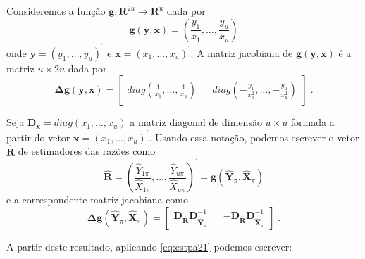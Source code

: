 \documentclass[]{book}
\theoremstyle{definition}
\theoremstyle{definition}
\theoremstyle{definition}
\theoremstyle{remark}
\begin{document}
Consideremos a função
\(\mathbf{g}:\textbf{R}^{2u}\rightarrow \textbf{R}^{u}\) dada por \[
\mathbf{g}\left( \mathbf{y},\mathbf{x}\right) =\left( \frac{y_{1}}{x_{1}},\ldots ,\frac{y_{u}}{x_{u}}\right) 
\] onde \(\mathbf{y=}\left( y_{1},\ldots ,y_{u}\right) ^{^{\prime }}\) e
\(\mathbf{x=}\left( x_{1},\ldots,x_{u}\right) ^{^{\prime }}\). A matriz
jacobiana de \(\mathbf{g}\left( \mathbf{y},\mathbf{x}\right)\) é a
matriz \(u\times 2u\) dada por \[
\mathbf{\Delta g}\left( \mathbf{y},\mathbf{x}\right) =\left[ 
\begin{array}{lll}
diag\left( \frac{1}{x_{1}},\ldots ,\frac{1}{x_{u}}\right) &  & diag\left( -\frac{y_{1}}{x_{1}^{2}},\ldots ,-\frac{y_{u}}{x_{u}^{2}}\right)
\end{array}
\right] \;\mbox{.} 
\]

Seja \(\mathbf{D}_{\mathbf{x}}=diag(x_{1},\ldots ,x_{u})\) a matriz
diagonal de dimensão \(u\times u\) formada a partir do vetor
\(\mathbf{x=}\left( x_{1},\ldots ,x_{u}\right) ^{^{\prime }}\). Usando
essa notação, podemos escrever o vetor \(\widehat{\mathbf{R}}\) de
estimadores das razões como \[
\widehat{\mathbf{R}}\mathbf{=}\left( \frac{\hat{Y}_{1\pi }}{\hat{X}_{1\pi }},\ldots ,\frac{\hat{Y}_{u\pi }}{\hat{X}_{u\pi }}\right) ^{^{\prime }}=\mathbf{g}\left( \mathbf{\hat{Y}}_{\pi },\mathbf{\hat{X}}_{\pi }\right)
\] e a correspondente matriz jacobiana como \[
\mathbf{\Delta g}\left( \mathbf{\hat{Y}}_{\pi },\mathbf{\hat{X}}_{\pi
}\right) =\left[ \begin{array}{lll}
\mathbf{\mathbf{D}_{\widehat{\mathbf{R}}}D}_{\mathbf{\hat{Y}}_{\pi }}^{-1} &\left. {}\right. & \mathbf{-\mathbf{D}_{\widehat{\mathbf{R}}}D}_{\mathbf{\hat{X}}_{\pi }}^{-1}
\end{array}
\right] \;. 
\]

A partir deste resultado, aplicando \eqref{eq:estpa21} podemos escrever:
\end{document}
